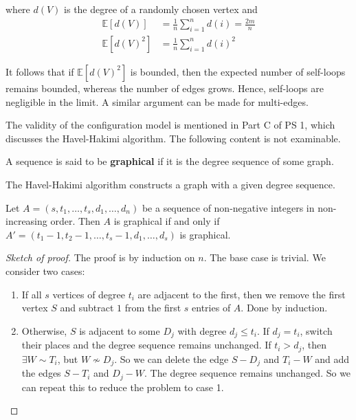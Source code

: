 \documentclass{article}
\begin{document}
where $d(V)$ is the degree of a randomly chosen vertex and 
\begin{align*}
    \mathbb{E}[d(V)] &= \frac{1}{n} \sum_{i=1}^{n} d(i) = \frac{2m}{n} \\
    \mathbb{E}[d(V)^{2}] &= \frac{1}{n} \sum_{i=1}^{n} d(i)^{2}
\end{align*}

It follows that if $\mathbb{E}[d(V)^{2}]$ is bounded, then the expected number of self-loops remains bounded, whereas the number of edges grows. Hence, self-loops are negligible in the limit. A similar argument can be made for multi-edges.  

\begin{unexaminable}
    The validity of the configuration model is mentioned in Part C of PS 1, which discusses the Havel-Hakimi algorithm. The following content is not examinable.
\end{unexaminable}

\begin{definition}
    A sequence is said to be \textbf{graphical} if it is the degree sequence of some graph.
\end{definition}

The Havel-Hakimi algorithm constructs a graph with a given degree sequence.
\begin{theorem}
    Let $A=(s, t_1, \ldots, t_s, d_1, \ldots, d_n)$ be a sequence of non-negative integers in non-increasing order. Then $A$ is graphical if and only if $A'=(t_1-1, t_2-1, \ldots, t_s-1, d_1, \ldots, d_s)$ is graphical.
\end{theorem}
\begin{proof}[Sketch of proof]
    The proof is by induction on $n$. The base case is trivial. We consider two cases: 
    \begin{enumerate}
        \item If all $s$ vertices of degree $t_i$ are adjacent to the first, then we remove the first vertex $S$ and subtract $1$ from the first $s$ entries of $A$. Done by induction.
        \item Otherwise, $S$ is adjacent to some $D_j$ with degree $d_j \leq t_i$. If $d_j=t_i$, switch their places and the degree sequence remains unchanged. If $t_i>d_j$, then $\exists W \sim T_i$, but $W \nsim D_j$. So we can delete the edge $S-D_j$ and $T_i-W$ and add the edges $S-T_i$ and $D_j-W$. The degree sequence remains unchanged. So we can repeat this to reduce the problem to case 1.
    \end{enumerate}
\end{proof}
\end{document}
